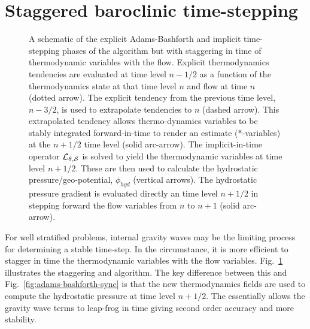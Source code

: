 \section{Staggered baroclinic time-stepping}
\label{sect:adams-bashforth-staggered}

\begin{figure}
\begin{center}
\end{center}
\caption{
A schematic of the explicit Adams-Bashforth and implicit time-stepping
phases of the algorithm but with staggering in time of thermodynamic
variables with the flow. Explicit thermodynamics tendencies are
evaluated at time level $n-1/2$ as a function of the thermodynamics
state at that time level $n$ and flow at time $n$ (dotted arrow). The
explicit tendency from the previous time level, $n-3/2$, is used to
extrapolate tendencies to $n$ (dashed arrow). This extrapolated
tendency allows thermo-dynamics variables to be stably integrated
forward-in-time to render an estimate ($*$-variables) at the $n+1/2$
time level (solid arc-arrow). The implicit-in-time operator ${\cal
L_{\theta,S}}$ is solved to yield the thermodynamic variables at time
level $n+1/2$. These are then used to calculate the hydrostatic
pressure/geo-potential, $\phi_{hyd}$ (vertical arrows). The
hydrostatic pressure gradient is evaluated directly an time level
$n+1/2$ in stepping forward the flow variables from $n$ to $n+1$
(solid arc-arrow). }
\label{fig:adams-bashforth-staggered}
\end{figure}

For well stratified problems, internal gravity waves may be the
limiting process for determining a stable time-step. In the
circumstance, it is more efficient to stagger in time the
thermodynamic variables with the flow
variables. Fig.~\ref{fig:adams-bashforth-staggered} illustrates the
staggering and algorithm. The key difference between this and
Fig.~\ref{fig:adams-bashforth-sync} is that the new thermodynamics
fields are used to compute the hydrostatic pressure at time level
$n+1/2$. The essentially allows the gravity wave terms to leap-frog in
time giving second order accuracy and more stability.

